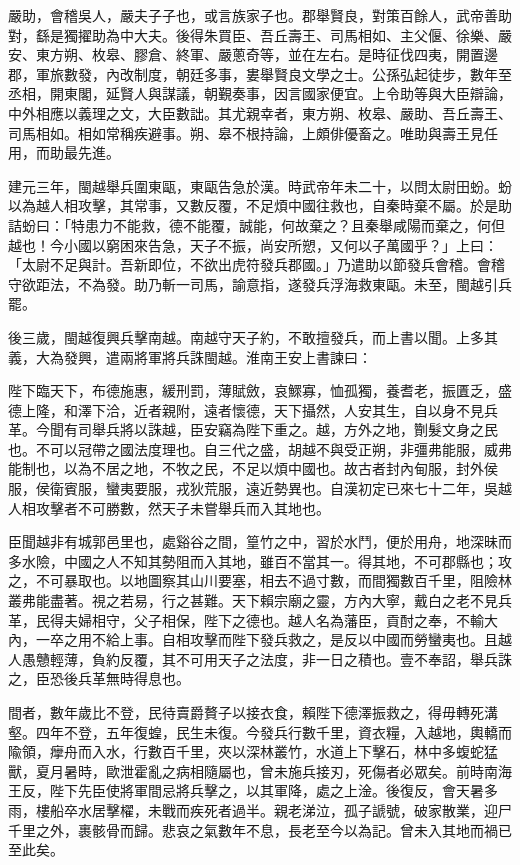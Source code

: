 
\begin{pinyinscope}
嚴助，會稽吳人，嚴夫子子也，或言族家子也。郡舉賢良，對策百餘人，武帝善助對，繇是獨擢助為中大夫。後得朱買臣、吾丘壽王、司馬相如、主父偃、徐樂、嚴安、東方朔、枚皋、膠倉、終軍、嚴蔥奇等，並在左右。是時征伐四夷，開置邊郡，軍旅數發，內改制度，朝廷多事，婁舉賢良文學之士。公孫弘起徒步，數年至丞相，開東閣，延賢人與謀議，朝覲奏事，因言國家便宜。上令助等與大臣辯論，中外相應以義理之文，大臣數詘。其尤親幸者，東方朔、枚皋、嚴助、吾丘壽王、司馬相如。相如常稱疾避事。朔、皋不根持論，上頗俳優畜之。唯助與壽王見任用，而助最先進。

建元三年，閩越舉兵圍東甌，東甌告急於漢。時武帝年未二十，以問太尉田蚡。蚡以為越人相攻擊，其常事，又數反覆，不足煩中國往救也，自秦時棄不屬。於是助詰蚡曰：「特患力不能救，德不能覆，誠能，何故棄之？且秦舉咸陽而棄之，何但越也！今小國以窮困來告急，天子不振，尚安所愬，又何以子萬國乎？」上曰：「太尉不足與計。吾新即位，不欲出虎符發兵郡國。」乃遣助以節發兵會稽。會稽守欲距法，不為發。助乃斬一司馬，諭意指，遂發兵浮海救東甌。未至，閩越引兵罷。

後三歲，閩越復興兵擊南越。南越守天子約，不敢擅發兵，而上書以聞。上多其義，大為發興，遣兩將軍將兵誅閩越。淮南王安上書諫曰：

陛下臨天下，布德施惠，緩刑罰，薄賦斂，哀鰥寡，恤孤獨，養耆老，振匱乏，盛德上隆，和澤下洽，近者親附，遠者懷德，天下攝然，人安其生，自以身不見兵革。今聞有司舉兵將以誅越，臣安竊為陛下重之。越，方外之地，劗髮文身之民也。不可以冠帶之國法度理也。自三代之盛，胡越不與受正朔，非彊弗能服，威弗能制也，以為不居之地，不牧之民，不足以煩中國也。故古者封內甸服，封外侯服，侯衛賓服，蠻夷要服，戎狄荒服，遠近勢異也。自漢初定已來七十二年，吳越人相攻擊者不可勝數，然天子未嘗舉兵而入其地也。

臣聞越非有城郭邑里也，處谿谷之間，篁竹之中，習於水鬥，便於用舟，地深昧而多水險，中國之人不知其勢阻而入其地，雖百不當其一。得其地，不可郡縣也；攻之，不可暴取也。以地圖察其山川要塞，相去不過寸數，而間獨數百千里，阻險林叢弗能盡著。視之若易，行之甚難。天下賴宗廟之靈，方內大寧，戴白之老不見兵革，民得夫婦相守，父子相保，陛下之德也。越人名為藩臣，貢酎之奉，不輸大內，一卒之用不給上事。自相攻擊而陛下發兵救之，是反以中國而勞蠻夷也。且越人愚戇輕薄，負約反覆，其不可用天子之法度，非一日之積也。壹不奉詔，舉兵誅之，臣恐後兵革無時得息也。

間者，數年歲比不登，民待賣爵贅子以接衣食，賴陛下德澤振救之，得毋轉死溝壑。四年不登，五年復蝗，民生未復。今發兵行數千里，資衣糧，入越地，輿轎而隃領，癴舟而入水，行數百千里，夾以深林叢竹，水道上下擊石，林中多蝮蛇猛獸，夏月暑時，歐泄霍亂之病相隨屬也，曾未施兵接刃，死傷者必眾矣。前時南海王反，陛下先臣使將軍間忌將兵擊之，以其軍降，處之上淦。後復反，會天暑多雨，樓船卒水居擊櫂，未戰而疾死者過半。親老涕泣，孤子謕號，破家散業，迎尸千里之外，裹骸骨而歸。悲哀之氣數年不息，長老至今以為記。曾未入其地而禍已至此矣。


\end{pinyinscope}
